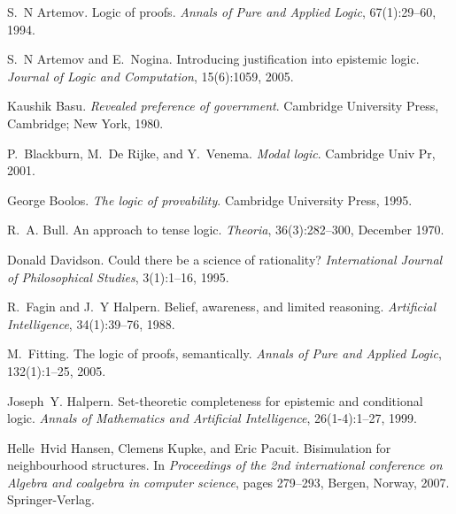 \documentclass{acmconf}
\newcommand{\tmtextit}[1]{{\itshape{#1}}}
\begin{document}
\begin{thebibliography}{10}
  S.~N Artemov. {\newblock}Logic of proofs.
  {\newblock}\tmtextit{Annals of Pure and Applied Logic}, 67(1):29--60, 1994.
  
  S.~N Artemov and E.~Nogina.
  {\newblock}Introducing justification into epistemic logic.
  {\newblock}\tmtextit{Journal of Logic and Computation}, 15(6):1059, 2005.
  
  Kaushik Basu. {\newblock}\tmtextit{Revealed
  preference of government}. {\newblock}Cambridge University Press, Cambridge;
  New York, 1980.
  
  P.~Blackburn, M.~De Rijke, and Y.~Venema.
  {\newblock}\tmtextit{Modal logic}. {\newblock}Cambridge Univ Pr, 2001.
  
  George Boolos. {\newblock}\tmtextit{The
  logic of provability}. {\newblock}Cambridge University Press, 1995.
  
  R.~A. Bull. {\newblock}An approach to tense
  logic. {\newblock}\tmtextit{Theoria}, 36(3):282--300, December 1970.
  
  Donald Davidson. {\newblock}Could there be
  a science of rationality? {\newblock}\tmtextit{International Journal of
  Philosophical Studies}, 3(1):1--16, 1995.
  
  R.~Fagin and J.~Y Halpern.
  {\newblock}Belief, awareness, and limited reasoning.
  {\newblock}\tmtextit{Artificial Intelligence}, 34(1):39--76, 1988.
  
  M.~Fitting. {\newblock}The logic of proofs,
  semantically. {\newblock}\tmtextit{Annals of Pure and Applied Logic},
  132(1):1--25, 2005.
  
  Joseph~Y. Halpern.
  {\newblock}Set-theoretic completeness for epistemic and conditional logic.
  {\newblock}\tmtextit{Annals of Mathematics and Artificial Intelligence},
  26(1-4):1--27, 1999.
  
  Helle~Hvid Hansen, Clemens Kupke,
  and Eric Pacuit. {\newblock}Bisimulation for neighbourhood structures.
  {\newblock}In \tmtextit{Proceedings of the 2nd international conference on
  Algebra and coalgebra in computer science}, pages 279--293, Bergen, Norway,
  2007. Springer-Verlag.
  

\end{thebibliography}
\end{document}
